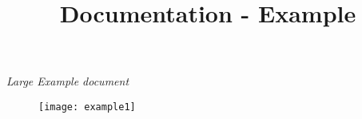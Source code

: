 \documentclass{article}
\title{Documentation - Example}
\begin{document}
    \textit{Large Example document}

    \begin{figure}
      \centering
        \texttt{[image: example1]}
    \end{figure}
\end{document}
